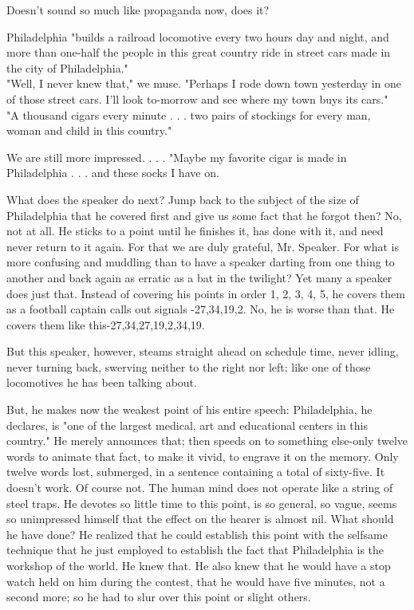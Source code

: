 \documentclass[10pt]{article}
\begin{document}
Doesn't sound so much like propaganda now, does it?

Philadelphia "builds a railroad locomotive every two hours day and night, and more than one-half the people in this great country ride in street cars made in the city of Philadelphia."\\
"Well, I never knew that," we muse. "Perhaps I rode down town yesterday in one of those street cars. I'll look to-morrow and see where my town buys its cars."\\
"A thousand cigars every minute . . . two pairs of stockings for every man, woman and child in this country."

We are still more impressed. . . . "Maybe my favorite cigar is made in Philadelphia . . . and these socks I have on.

What does the speaker do next? Jump back to the subject of the size of Philadelphia that he covered first and give us some fact that he forgot then? No, not at all. He sticks to a point until he finishes it, has done with it, and need never return to it again. For that we are duly grateful, Mr. Speaker. For what is more confusing and muddling than to have a speaker darting from one thing to\\
another and back again as erratic as a bat in the twilight? Yet many a speaker does just that. Instead of covering his points in order 1, 2, 3, 4, 5, he covers them as a football captain calls out signals -27,34,19,2. No, he is worse than that. He covers them like this-27,34,27,19,2,34,19.

But this speaker, however, steams straight ahead on schedule time, never idling, never turning back, swerving neither to the right nor left; like one of those locomotives he has been talking about.

But, he makes now the weakest point of his entire speech: Philadelphia, he declares, is "one of the largest medical, art and educational centers in this country." He merely announces that; then speeds on to something else-only twelve words to animate that fact, to make it vivid, to engrave it on the memory. Only twelve words lost, submerged, in a sentence containing a total of sixty-five. It doesn't work. Of course not. The human mind does not operate like a string of steel traps. He devotes so little time to this point, is so general, so vague, seems so unimpressed himself that the effect on the hearer is almost nil. What should he have done? He realized that he could establish this point with the selfsame technique that he just employed to establish the fact that Philadelphia is the workshop of the world. He knew that. He also knew that he would have a stop watch held on him during the contest, that he would have five minutes, not a second more; so he had to slur over this point or slight others.
\end{document}
